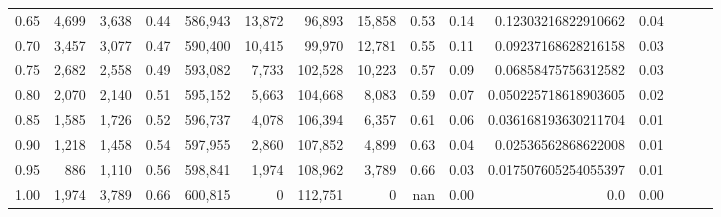 \begin{tabular}{rrrrrrrrrrrrrrr}
0.65 &    4,699 &   3,638 &  0.44 &  586,943 &   13,872 &   96,893 &   15,858 &  0.53 &  0.14 &   0.12303216822910662 &      0.04 \\
0.70 &    3,457 &   3,077 &  0.47 &  590,400 &   10,415 &   99,970 &   12,781 &  0.55 &  0.11 &   0.09237168628216158 &      0.03 \\
0.75 &    2,682 &   2,558 &  0.49 &  593,082 &    7,733 &  102,528 &   10,223 &  0.57 &  0.09 &   0.06858475756312582 &      0.03 \\
0.80 &    2,070 &   2,140 &  0.51 &  595,152 &    5,663 &  104,668 &    8,083 &  0.59 &  0.07 &  0.050225718618903605 &      0.02 \\
0.85 &    1,585 &   1,726 &  0.52 &  596,737 &    4,078 &  106,394 &    6,357 &  0.61 &  0.06 &  0.036168193630211704 &      0.01 \\
0.90 &    1,218 &   1,458 &  0.54 &  597,955 &    2,860 &  107,852 &    4,899 &  0.63 &  0.04 &   0.02536562868622008 &      0.01 \\
0.95 &      886 &   1,110 &  0.56 &  598,841 &    1,974 &  108,962 &    3,789 &  0.66 &  0.03 &  0.017507605254055397 &      0.01 \\
1.00 &    1,974 &   3,789 &  0.66 &  600,815 &        0 &  112,751 &        0 &   nan &  0.00 &                   0.0 &      0.00 \\
\bottomrule
\end{tabular}
